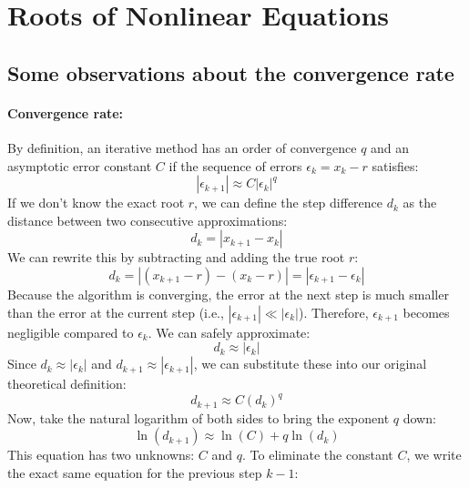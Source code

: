 \section{Roots of Nonlinear Equations}

\subsection{Some observations about the convergence rate}\label{sec:convergence-rate}

\paragraph{Convergence rate:}
By definition, an iterative method has an order of convergence $q$ and an
asymptotic error constant $C$ if the sequence of errors $\epsilon_k = x_k - r$
satisfies:
\begin{equation*}
	|\epsilon_{k+1}| \approx C |\epsilon_k|^q
\end{equation*}
If we don't know the exact root $r$, we can define the step difference $d_k$ as
the distance between two consecutive approximations:
\begin{equation*}
	d_k = |x_{k+1} - x_k|
\end{equation*}
We can rewrite this by subtracting and adding the true root $r$:
\begin{equation*}
	d_k = |(x_{k+1} - r) - (x_k - r)| = |\epsilon_{k+1} - \epsilon_k|
\end{equation*}
Because the algorithm is converging, the error at the next step is much smaller
than the error at the current step (i.e., $|\epsilon_{k+1}| \ll |\epsilon_k|$).
Therefore, $\epsilon_{k+1}$ becomes negligible compared to $\epsilon_k$.
We can safely approximate:
\begin{equation*}
	d_k \approx |\epsilon_k|
\end{equation*}
Since $d_k \approx |\epsilon_k|$ and $d_{k+1} \approx |\epsilon_{k+1}|$, we can
substitute these into our original theoretical definition:
\begin{equation*}
	d_{k+1} \approx C (d_k)^q
\end{equation*}
Now, take the natural logarithm of both sides to bring the exponent
$q$ down:
\begin{equation*}
	\ln(d_{k+1}) \approx \ln(C) + q \ln(d_k)
\end{equation*}
This equation has two unknowns: $C$ and $q$. To eliminate the constant $C$, we
write the exact same equation for the previous step $k-1$:
